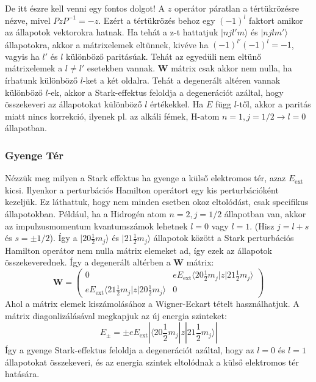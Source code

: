 \documentclass[../main.tex]{subfiles}
\begin{document}
De itt észre kell venni egy fontos dolgot! A $z$ operátor páratlan a tértükrözésre nézve, mivel $P z P^{-1} = -z$. Ezért a tértükrözés behoz egy $(-1)^l$ faktort amikor az állapotok vektorokra hatnak.
Ha tehát a z-t hattatjuk $|njl'm\rangle$ és $|njlm'\rangle$ állapotokra, akkor a mátrixelemek eltünnek, kivéve ha $(-1)^{l'}(-1)^l = -1$, vagyis ha $l'$ és $l$ különböző paritásúak.
Tehát az egyedüli nem eltünő mátrixelemek a $l \neq l'$ esetekben vannak. $\mathbf{W}$ mátrix csak akkor nem nulla, ha írhatunk különböző $l$-ket a két oldalra.
Tehát a degenerált altéren vannak különböző $l$-ek, akkor a Stark-effektus feloldja a degenerációt azáltal, hogy összekeveri az állapotokat különböző $l$ értékekkel.
Ha $E$ függ $l$-től, akkor a paritás miatt nincs korrekció, ilyenek pl. az alkáli fémek, H-atom $n=1, j=1/2 \to l=0$ állapotban.
  
\subsubsection*{Gyenge Tér}
Nézzük meg milyen a Stark effektus ha gyenge a külső elektromos tér, azaz $E_{\text{ext}}$ kicsi. Ilyenkor a perturbációs Hamilton operátort egy kis perturbációként kezeljük.
Ez láthattuk, hogy nem minden esetben okoz eltolódást, csak specifikus állapotokban. Például, ha a Hidrogén atom  $n=2, j=1/2$ állapotban van, akkor az impulzusmomentum kvantumszámok lehetnek $l=0$ vagy $l=1$.
(Hisz $j = l + s$ és $s= \pm 1/2$). Így a $|2 0 \frac{1}{2} m_j \rangle$ és $|2 1 \frac{1}{2} m_j \rangle$ állapotok között a Stark perturbációs Hamilton operátor nem nulla mátrix elemeket ad, így ezek az állapotok összekeverednek. Így a degenerált altérben a $\mathbf{W}$ mátrix:
\begin{equation}
    \mathbf{W} = \begin{pmatrix}
        0 & e E_{\text{ext}} \langle 2 0 \frac{1}{2} m_j | z | 2 1 \frac{1}{2} m_j \rangle \\
        e E_{\text{ext}} \langle 2 1 \frac{1}{2} m_j | z | 2 0 \frac{1}{2} m_j \rangle & 0
    \end{pmatrix}
\end{equation}
Ahol a mátrix elemek kiszámolásához a Wigner-Eckart tételt használhatjuk. A mátrix diagonlizálásával megkapjuk az új energia szinteket:
\begin{equation}
    E_{\pm} = \pm e E_{\text{ext}} |\langle 2 0 \frac{1}{2} m_j | z | 2 1 \frac{1}{2} m_j \rangle|
\end{equation}
Így a gyenge Stark-effektus feloldja a degenerációt azáltal, hogy az $l=0$ és $l=1$ állapotokat összekeveri, és az energia szintek eltolódnak a külső elektromos tér hatására.
\end{document}
